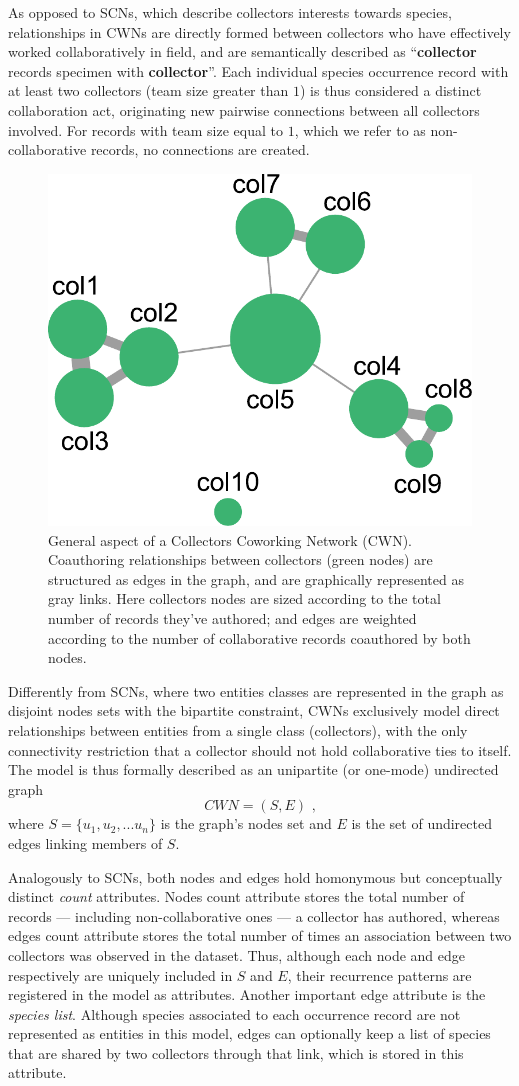{As opposed to SCNs, which describe collectors interests towards species, relationships in CWNs are directly formed between collectors who have effectively worked collaboratively in field, and are semantically described as ``\textbf{collector} records specimen with \textbf{collector}''.
Each individual species occurrence record with at least two collectors (team size greater than $1$) is thus considered a distinct collaboration act, originating new pairwise connections between all collectors involved.
For records with team size equal to $1$, which we refer to as non-collaborative records, no connections are created.

  \begin{figure}[h!]
  	\centering
    \includegraphics[width=.4\linewidth]{figures/network_models/cwn_generalaspect.pdf}
    \caption{General aspect of a Collectors Coworking Network (CWN). Coauthoring relationships between collectors (green nodes) are structured as edges in the graph, and are graphically represented as gray links.
    Here collectors nodes are sized according to the total number of records they've authored; and edges are weighted according to the number of collaborative records coauthored by both nodes.}
    \label{fig:cwn_general}
  \end{figure}

Differently from SCNs, where two entities classes are represented in the graph as disjoint nodes sets with the bipartite constraint, CWNs exclusively model direct relationships between entities from a single class (collectors), with the only connectivity restriction that a collector should not hold collaborative ties to itself.
The model is thus formally described as an unipartite (or one-mode) undirected graph
$$CWN = (S,E) \mbox{ ,}$$
where $S=\{u_1,u_2,...u_n\}$ is the graph's nodes set and $E$ is the set of undirected edges linking members of $S$.

Analogously to SCNs, both nodes and edges hold homonymous but conceptually distinct \textit{count} attributes.
Nodes count attribute stores the total number of records --- including non-collaborative ones --- a collector has authored, whereas
edges count attribute stores the total number of times an association between two collectors was observed in the dataset. Thus, although each node and edge respectively are uniquely included in $S$ and $E$, their recurrence patterns are registered in the model as attributes.
Another important edge attribute is the \textit{species list}. Although species associated to each occurrence record are not represented as entities in this model, edges can optionally keep a list of species that are shared by two collectors through that link, which is stored in this attribute.

}
